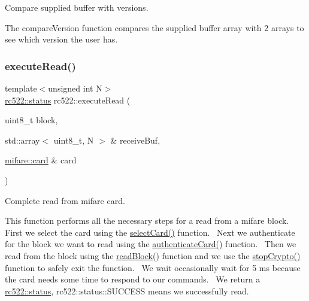 Compare supplied buffer with versions. 

The compare\+Version function compares the supplied buffer array with 2 arrays to see which version the user has. \mbox{\label{classrc522_aa0eeb1eedf5ca47a44cab85a387156f3}} 
\subsubsection{\texorpdfstring{execute\+Read()}{executeRead()}}
{\footnotesize\ttfamily template$<$unsigned int N$>$ \\
\hyperlink{classspiReader_a4bcf984823c38cf4841ebf619e788790}{rc522\+::status} rc522\+::execute\+Read (\begin{DoxyParamCaption}\item[{uint8\+\_\+t}]{block,  }\item[{std\+::array$<$ uint8\+\_\+t, N $>$ \&}]{receive\+Buf,  }\item[{\hyperlink{classmifare_1_1card}{mifare\+::card} \&}]{card }\end{DoxyParamCaption})\hspace{0.3cm}{\ttfamily [inline]}}



Complete read from mifare card. 

This function performs all the necessary steps for a read from a mifare block.~\newline
First we select the card using the \hyperlink{classrc522_a5016ad241df63301c261709debcb274b}{select\+Card()} function.~\newline
Next we authenticate for the block we want to read using the \hyperlink{classrc522_a9cba68c4fff6e1acf8bf9b2601197d96}{authenticate\+Card()} function.~\newline
Then we read from the block using the \hyperlink{classrc522_a87dfbf9cf9707a675c91981c92c93fdc}{read\+Block()} function and we use the \hyperlink{classrc522_a0f15a1c190dcde40f314ff4f6ffb65e4}{stop\+Crypto()} function to safely exit the function.~\newline
We wait occasionally wait for 5 ms because the card needs some time to respond to our commands.~\newline
We return a \hyperlink{classspiReader_a4bcf984823c38cf4841ebf619e788790}{rc522\+::status}, rc522\+::status\+::\+S\+U\+C\+C\+E\+SS means we successfully read. \mbox{\label{classrc522_adab984cd49ca9affb679dded266c43f0}} 
